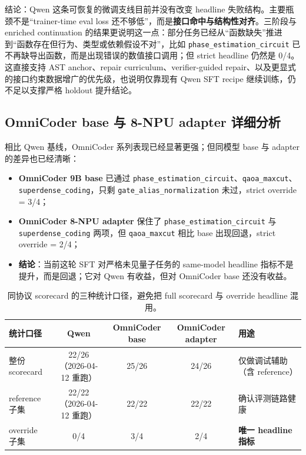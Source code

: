 \documentclass[11pt,a4paper]{article}
\newcommand{\code}[1]{\begingroup\ttfamily\footnotesize\nolinkurl{#1}\endgroup}
\begin{document}
结论：Qwen 这条可恢复的微调支线目前并没有改变 headline 失败结构。主要瓶颈不是“trainer-time eval loss 还不够低”，而是\textbf{接口命中与结构性对齐}。三阶段与 enriched continuation 的结果更说明这一点：部分任务已经从“函数缺失”推进到“函数存在但行为、类型或依赖假设不对”，比如 \code{phase\_estimation\_circuit} 已不再缺导出函数，而是出现错误的数值接口调用；但 strict headline 仍然是 0/4。这直接支持 AST anchor、repair curriculum、verifier-guided repair、以及更显式的接口约束数据增广的优先级，也说明仅靠现有 Qwen SFT recipe 继续训练，仍不足以支撑严格 holdout 提升结论。

\subsection{OmniCoder base 与 8-NPU adapter 详细分析}

相比 Qwen 基线，OmniCoder 系列表现已经显著更强；但同模型 base 与 adapter 的差异也已经清晰：
\begin{itemize}
  \item \textbf{OmniCoder 9B base} 已通过 \code{phase\_estimation\_circuit}、\code{qaoa\_maxcut}、\code{superdense\_coding}，只剩 \code{gate\_alias\_normalization} 未过，strict override = 3/4；
  \item \textbf{OmniCoder 8-NPU adapter} 保住了 \code{phase\_estimation\_circuit} 与 \code{superdense\_coding} 两项，但 \code{qaoa\_maxcut} 相比 base 出现回退，strict override = 2/4；
  \item \textbf{结论}：当前这轮 SFT 对严格未见量子任务的 same-model headline 指标不是提升，而是回退；它对 Qwen 有收益，但对 OmniCoder base 还没有收益。
\end{itemize}

\begin{table}[htbp]
\centering
\small
\begin{tabularx}{\textwidth}{p{2.8cm} c c c Y}
\toprule
统计口径 & Qwen & OmniCoder base & OmniCoder adapter & 用途 \\
\midrule
整份 scorecard & 22/26（2026-04-12 重跑） & 25/26 & 24/26 & 仅做调试辅助（含 reference） \\
reference 子集 & 22/22（2026-04-12 重跑） & 22/22 & 22/22 & 确认评测链路健康 \\
override 子集 & 0/4 & 3/4 & 2/4 & \textbf{唯一 headline 指标} \\
\bottomrule
\end{tabularx}
\caption{同协议 scorecard 的三种统计口径，避免把 full scorecard 与 override headline 混用。}
\label{tab:strict-scorecard-views}
\end{table}
\end{document}
